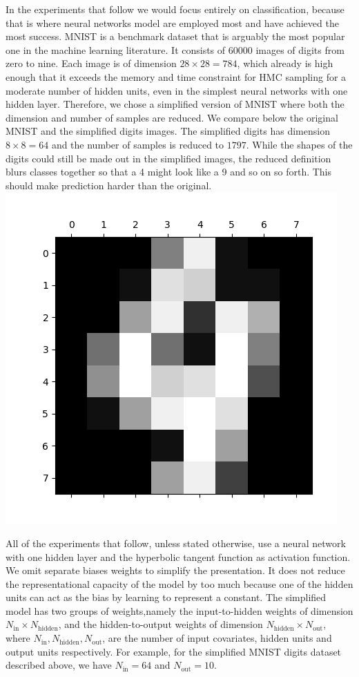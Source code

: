 \documentclass[12pt]{report}
\begin{document}
In the experiments that follow we would focus entirely on classification, because that is where neural networks model are employed most and have achieved the most success. MNIST \cite{lecun-mnisthandwrittendigit-2010} is a benchmark dataset that is arguably the most popular one in the machine learning literature. It consists of 60000 images of digits from zero to nine. Each image is of dimension $ 28 \times 28 = 784 $, which already is high enough that it exceeds the memory and time constraint for HMC sampling for a moderate number of hidden units, even in the simplest neural networks with one hidden layer. Therefore, we chose a simplified version of MNIST where both the dimension and number of samples are reduced. We compare below the original MNIST and the simplified digits images. The simplified digits has dimension $8 \times 8 = 64 $ and the number of samples is reduced to $1797$. While the shapes of the digits could still be made out in the simplified images, the reduced definition blurs classes together so that a 4 might look like a 9 and so on so forth. This should make prediction harder than the original.
\includegraphics{mnist1.png}



All of the experiments that follow, unless stated otherwise, use a neural network with one hidden layer and the hyperbolic tangent function as activation function. We omit separate biases weights to simplify the presentation. It does not reduce the representational capacity of the model by too much because one of the hidden units can act as the bias by learning to represent a constant. The simplified model has two groups of weights,namely the input-to-hidden weights of dimension $N_{\text{in}} \times N_{\text{hidden}}$, and the hidden-to-output weights of dimension $N_{\text{hidden}} \times N_{\text{out}} $, where $N_{\text{in}},N_{\text{hidden}},N_{\text{out}}$, are the number of input covariates, hidden units and output units respectively. For example, for the simplified MNIST digits dataset described above, we have $N_{\text{in}} = 64 $ and $N_{\text{out}} = 10 $. 
\end{document}
